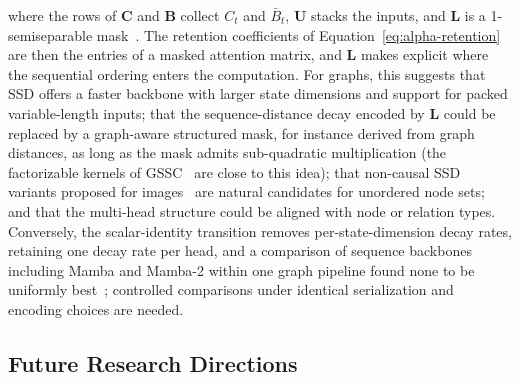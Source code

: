 \documentclass[acmsmall]{acmart}
\begin{document}
\noindent where the rows of $\mathbf{C}$ and $\mathbf{B}$ collect $C_t$ and
$\bar{B}_t$, $\mathbf{U}$ stacks the inputs, and $\mathbf{L}$ is a
1-semiseparable mask~\cite{dao2024transformers}. The retention coefficients of
Equation~\eqref{eq:alpha-retention} are then the entries of a masked attention
matrix, and $\mathbf{L}$ makes explicit where the sequential ordering enters
the computation. For graphs, this suggests that SSD offers a faster backbone
with larger state dimensions and support for packed variable-length inputs;
that the sequence-distance decay encoded by $\mathbf{L}$ could be replaced by a
graph-aware structured mask, for instance derived from graph distances, as
long as the mask admits sub-quadratic multiplication (the factorizable kernels
of GSSC~\cite{huang2024can} are close to this idea); that non-causal SSD
variants proposed for images~\cite{shi2025vssd} are natural candidates for
unordered node sets; and that the multi-head structure could be aligned with
node or relation types.
Conversely, the scalar-identity transition removes per-state-dimension decay rates, retaining one decay rate per head, and a comparison of sequence backbones including
Mamba and Mamba-2 within one graph pipeline found none to be uniformly
best~\cite{behrouz2024best}; controlled comparisons under identical
serialization and encoding choices are needed.

\subsection{Future Research Directions}
\label{sec7}
\end{document}
